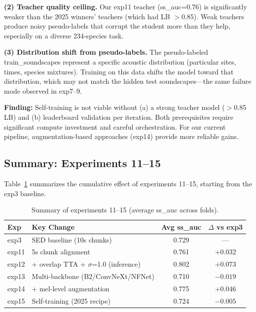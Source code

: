 \textbf{(2) Teacher quality ceiling.}
Our exp11 teacher (ss\_auc=0.76) is significantly weaker than the 2025
winners' teachers (which had LB $>$0.85). Weak teachers produce noisy
pseudo-labels that corrupt the student more than they help, especially
on a diverse 234-species task.

\textbf{(3) Distribution shift from pseudo-labels.}
The pseudo-labeled train\_soundscapes represent a specific acoustic
distribution (particular sites, times, species mixtures). Training on this
data shifts the model toward that distribution, which may not match the
hidden test soundscapes---the same failure mode observed in exp7--9.

\textbf{Finding:} Self-training is not viable without (a) a strong teacher
model ($>$0.85 LB) and (b) leaderboard validation per iteration. Both
prerequisites require significant compute investment and careful orchestration.
For our current pipeline, augmentation-based approaches (exp14) provide more
reliable gains.

\subsection{Summary: Experiments 11--15}
\label{sec:exp11-15-summary}

Table~\ref{tab:exp11-15-summary} summarizes the cumulative effect of
experiments 11--15, starting from the exp3 baseline.

\begin{table}[h]
\centering
\caption{Summary of experiments 11--15 (average ss\_auc across folds).}
\label{tab:exp11-15-summary}
\begin{tabular}{llcc}
\hline
\textbf{Exp} & \textbf{Key Change} & \textbf{Avg ss\_auc} & \textbf{$\Delta$ vs exp3} \\
\hline
exp3  & SED baseline (10s chunks) & 0.729 & --- \\
exp11 & 5s chunk alignment & 0.761 & $+0.032$ \\
exp12 & + overlap TTA + $\sigma$=1.0 (inference) & 0.802 & $+0.073$ \\
exp13 & Multi-backbone (B2/ConvNeXt/NFNet) & 0.710 & $-0.019$ \\
exp14 & + mel-level augmentation & 0.775 & $+0.046$ \\
exp15 & Self-training (2025 recipe) & 0.724 & $-0.005$ \\
\hline
\end{tabular}
\end{table}

